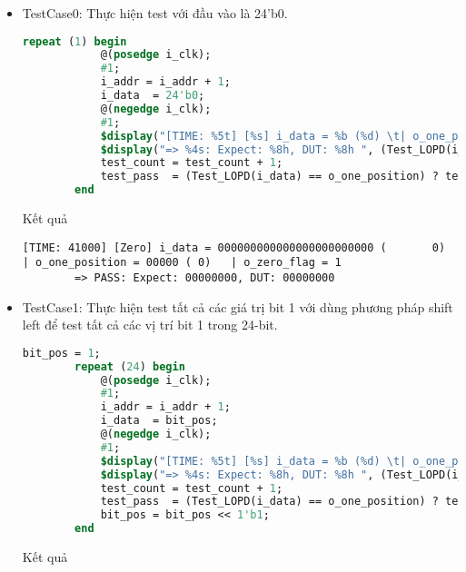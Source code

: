 \begin{itemize}[label=-]
	\item TestCase0: Thực hiện test với đầu vào là \textsf{24'b0}.
	
	\begin{lstlisting}[style=StyleCode, language=SystemVerilog, caption={Test trường hợp 24-bit không có bit 1.}]
		repeat (1) begin
			@(posedge i_clk);
			#1;
			i_addr = i_addr + 1;
			i_data  = 24'b0;
			@(negedge i_clk);
			#1;
			$display("[TIME: %5t] [%s] i_data = %b (%d) \t| o_one_position = %b (%d) \t| o_zero_flag = %b", $time, "Zero", i_data, i_data, o_one_position, o_one_position, o_zero_flag);
			$display("=> %4s: Expect: %8h, DUT: %8h ", (Test_LOPD(i_data) == o_one_position) ? "PASS" : "FAIL", o_one_position, Test_LOPD(i_data));
			test_count = test_count + 1;
			test_pass  = (Test_LOPD(i_data) == o_one_position) ? test_pass + 1 : test_pass;
		end
	\end{lstlisting}

	Kết quả
	
	\begin{lstlisting}[style=StyleResult, language=Result, caption={Kết quả của trường hợp 24-bit không có bit 1.}]
		[TIME: 41000] [Zero] i_data = 000000000000000000000000 (       0)       | o_one_position = 00000 ( 0)   | o_zero_flag = 1
		=> PASS: Expect: 00000000, DUT: 00000000
	\end{lstlisting}
	\item TestCase1: Thực hiện test tất cả các giá trị bit 1 với dùng phương pháp shift left để test tất cả các vị trí bit 1 trong 24-bit.
	
	\begin{lstlisting}[style=StyleCode, language=SystemVerilog, caption={Test 24 trường hợp vị trí bit 1 cho bộ LOPD 24-bit.}]
		bit_pos = 1;
		repeat (24) begin
			@(posedge i_clk);
			#1;
			i_addr = i_addr + 1;
			i_data  = bit_pos;
			@(negedge i_clk);
			#1;
			$display("[TIME: %5t] [%s] i_data = %b (%d) \t| o_one_position = %b (%d) \t| o_zero_flag = %b", $time, "Direcly", i_data, i_data, o_one_position, o_one_position, o_zero_flag);
			$display("=> %4s: Expect: %8h, DUT: %8h ", (Test_LOPD(i_data) == o_one_position) ? "PASS" : "FAIL", o_one_position, Test_LOPD(i_data));
			test_count = test_count + 1;
			test_pass  = (Test_LOPD(i_data) == o_one_position) ? test_pass + 1 : test_pass;
			bit_pos = bit_pos << 1'b1;
		end
	\end{lstlisting}
	
	Kết quả
	

\end{itemize}
